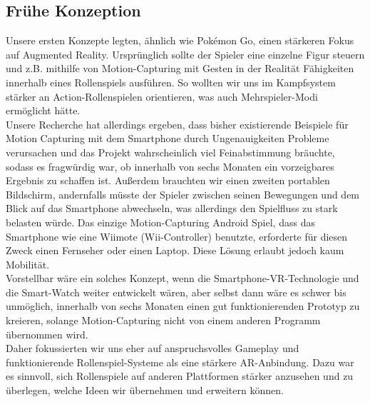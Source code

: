 \documentclass[extern,palatino]{cgBA}
\begin{document}
\subsection{Frühe Konzeption}
Unsere ersten Konzepte legten, ähnlich wie Pokémon Go, einen stärkeren Fokus auf Augmented Reality. Ursprünglich sollte der Spieler eine einzelne Figur steuern und z.B. mithilfe von Motion-Capturing mit Gesten in der Realität Fähigkeiten innerhalb eines Rollenspiels ausführen. So wollten wir uns im Kampfsystem stärker an Action-Rollenspielen orientieren, was auch Mehrspieler-Modi ermöglicht hätte.
\\Unsere Recherche hat allerdings ergeben, dass bisher existierende Beispiele für Motion Capturing mit dem Smartphone durch Ungenauigkeiten Probleme verursachen und das Projekt wahrscheinlich viel Feinabstimmung bräuchte, sodass es fragwürdig war, ob innerhalb von sechs Monaten ein vorzeigbares Ergebnis zu schaffen ist. Außerdem brauchten wir einen zweiten portablen Bildschirm, andernfalls müsste der Spieler zwischen seinen Bewegungen und dem Blick auf das Smartphone abwechseln, was allerdings den Spielfluss zu stark belasten würde. Das einzige Motion-Capturing Android Spiel, dass das Smartphone wie eine Wiimote (Wii-Controller) benutzte, erforderte für diesen Zweck einen Fernseher oder einen Laptop. Diese Lösung erlaubt jedoch kaum Mobilität.
\\Vorstellbar wäre ein solches Konzept, wenn die Smartphone-VR-Technologie und die Smart-Watch weiter entwickelt wären, aber selbst dann wäre es schwer bis unmöglich, innerhalb von sechs Monaten einen gut funktionierenden Prototyp zu kreieren, solange Motion-Capturing nicht von einem anderen Programm übernommen wird.
\\Daher fokussierten wir uns eher auf anspruchsvolles Gameplay und funktionierende Rollenspiel-Systeme als eine stärkere AR-Anbindung. Dazu war es sinnvoll, sich Rollenspiele auf anderen Plattformen stärker anzusehen und zu überlegen, welche Ideen wir übernehmen und erweitern können.
\newpage
\end{document}
